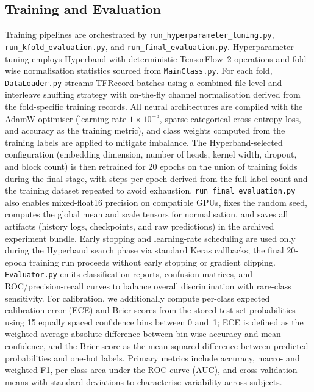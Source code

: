 \subsection{Training and Evaluation}
Training pipelines are orchestrated by \texttt{run\_hyperparameter\_tuning.py}, \texttt{run\_kfold\_evaluation.py}, and \texttt{run\_final\_evaluation.py}. Hyperparameter tuning employs Hyperband with deterministic TensorFlow~2 operations and fold-wise normalisation statistics sourced from \texttt{MainClass.py}\cite{li2018hyperband}. For each fold, \texttt{DataLoader.py} streams TFRecord batches using a combined file-level and interleave shuffling strategy with on-the-fly channel normalisation derived from the fold-specific training records. All neural architectures are compiled with the AdamW optimiser\cite{kingma2015adam} (learning rate $1\times10^{-5}$, sparse categorical cross-entropy loss, and accuracy as the training metric), and class weights computed from the training labels are applied to mitigate imbalance. The Hyperband-selected configuration (embedding dimension, number of heads, kernel width, dropout, and block count) is then retrained for 20 epochs on the union of training folds during the final stage, with steps per epoch derived from the full label count and the training dataset repeated to avoid exhaustion. \texttt{run\_final\_evaluation.py} also enables mixed-float16 precision on compatible GPUs, fixes the random seed, computes the global mean and scale tensors for normalisation, and saves all artifacts (history logs, checkpoints, and raw predictions) in the archived experiment bundle. Early stopping and learning-rate scheduling are used only during the Hyperband search phase via standard Keras callbacks; the final 20-epoch training run proceeds without early stopping or gradient clipping. \texttt{Evaluator.py} emits classification reports, confusion matrices, and ROC/precision-recall curves to balance overall discrimination with rare-class sensitivity\cite{fawcett2006introduction,saito2015precision}. For calibration, we additionally compute per-class expected calibration error (ECE) and Brier scores from the stored test-set probabilities using 15 equally spaced confidence bins between 0 and~1; ECE is defined as the weighted average absolute difference between bin-wise accuracy and mean confidence, and the Brier score as the mean squared difference between predicted probabilities and one-hot labels. Primary metrics include accuracy, macro- and weighted-F1, per-class area under the ROC curve (AUC), and cross-validation means with standard deviations to characterise variability across subjects.

